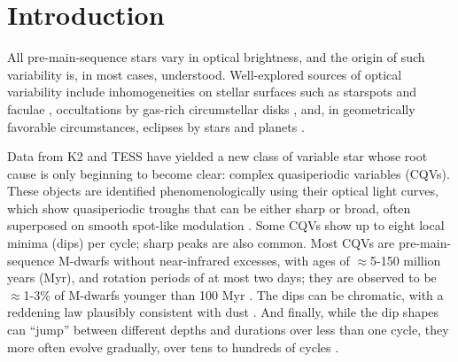\documentclass[11pt,twocolumn,tighten]{aastex63}
\begin{document}


\section{Introduction}
\label{sec:intro}


All pre-main-sequence stars vary in optical brightness, and the origin
of such variability is, in most cases, understood.  Well-explored
sources of optical variability include inhomogeneities on stellar
surfaces such as starspots and faculae \citep{2021isma.book.....B},
occultations by gas-rich circumstellar disks
\citep{2017MNRAS.470..202B}, and, in geometrically favorable
circumstances, eclipses by stars and planets
\citep{2010exop.book...55W}.

Data from K2 and TESS have yielded a new class of variable star whose
root cause is only beginning to become clear: complex quasiperiodic
variables (CQVs).  These objects are identified phenomenologically
using their optical light curves, which show quasiperiodic troughs
that can be either sharp or broad, often superposed on smooth
spot-like modulation
\citep{2017AJ....153..152S,2018AJ....155...63S,2019ApJ...876..127Z}.
Some CQVs show up to eight local minima (dips) per cycle; sharp peaks
are also common.  Most CQVs are pre-main-sequence M-dwarfs without
near-infrared excesses, with ages of $\approx$5-150 million years
(Myr), and rotation periods of at most two days; they are observed to
be $\approx$1-3\% of M-dwarfs younger than 100 Myr
\citep{2016AJ....152..114R,2022AJ....163..144G}.  The dips can be
chromatic, with a reddening law plausibly consistent with dust
\citep{2020AJ....160...86B,2022AJ....163..144G,2023MNRAS.518.2921K}.
And finally, while the dip shapes can ``jump'' between different
depths and durations over less than one cycle, they more often evolve
gradually, over tens to hundreds of cycles
\citep[e.g.][]{2017AJ....153..152S,2022ApJ...925...75P,2023ApJ...945..114P}.
\end{document}
